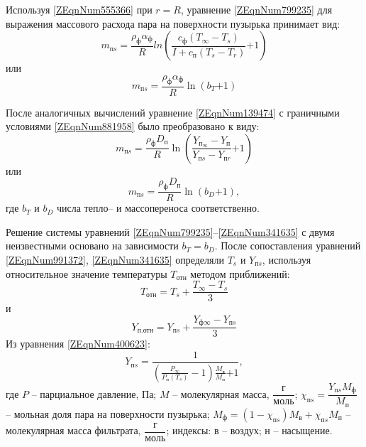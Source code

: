 Используя \eqref{ZEqnNum555366} при $r{ =}R$, уравнение \eqref{ZEqnNum799235} для выражения массового расхода пара на поверхности пузырька принимает вид:
\begin{equation} \label{10)} 
m_{{ п}s}{ =}\frac{{\rho }_{{ ф}}{\alpha }_{{ ф}}}{R}{ ln}\left(\frac{c_{{ ф}}\left(T_{\infty }{ -}T_{{ s}}\right)}{I{ +}c_{{ п}}\left(T_{{ s}}{ -}T_r\right)}{ +1}\right) 
\end{equation} 
или
\begin{equation} \label{ZEqnNum991372} 
m_{{ п}s}{ =}\frac{{\rho }_{{ ф}}{\alpha }_{{ ф}}}{R}{ \ln}\left(b_T{ +1}\right) 
\end{equation} 

После аналогичных вычислений уравнение \eqref{ZEqnNum139474} с граничными условиями \eqref{ZEqnNum881958} было преобразовано к виду:
\begin{equation} \label{12)} 
m_{{ п}s}{ =}\frac{{\rho }_{{ ф}}D_{{ п}}}{R}{ \ln}\left(\frac{Y_{{{ п}}_{\infty }}{ -}Y_{{ п}}}{Y_{{ п}s}{ -}Y_{{ п}r}}{ +1}\right) 
\end{equation} 
или
\begin{equation} \label{ZEqnNum341635} 
m_{{ п}s}{ =}\frac{{\rho }_{{ ф}}D_{{ п}}}{R}{ \ln}\left(b_D{ +1}\right),  
\end{equation} 
где $b_T$ и $b_D$ числа тепло-- и массопереноса соответственно.

Решение системы уравнений \eqref{ZEqnNum799235}--\eqref{ZEqnNum341635} с двумя неизвестными основано на зависимости $b_T{ =}b_D$. После сопоставления уравнений \eqref{ZEqnNum991372}, \eqref{ZEqnNum341635} определяли $T_s$ и $Y_{{ п}s}$, используя относительное значение температуры $T_{{ отн}}$ методом приближений:
\begin{equation} \label{14)} 
T_{{ отн}}{ =}T_s{ +}\frac{T_{\infty }{ -}T_s}{{ 3}} 
\end{equation} 
и
\begin{equation} \label{ZEqnNum400623} 
Y_{{ п.отн}}{ =}Y_{{ п}s}{ +}\frac{Y_{{ ф}\infty }{ -}Y_{{ п}s}}{{ 3}} 
\end{equation} 
Из уравнения \eqref{ZEqnNum400623}:
\begin{equation} \label{16)} 
Y_{{ п}s}{ =}\frac{{ 1}}{\left(\frac{P_{\infty }}{P_{{ н}}\left(T_s\right)}{ -}{ 1}\right)\frac{M_{{ в}}}{M_{{ п}}}{ +1}},  
\end{equation} 
где $P$ -- парциальное давление, Па; $M$ -- молекулярная масса, $\dfrac{г}{моль}$;  ${\chi }_{{ пs}}{ =}\dfrac{Y_{{ пs}}M_{{ ф}}}{M_{{ п}}}$ -- мольная доля пара на поверхности пузырька; $M_{{ ф}}{ =}\left({ 1-}{\chi }_{{ пs}}\right)M_{{ в}}{ +}{\chi }_{{ пs}}M_{{ п}}$ -- молекулярная масса фильтрата, $\dfrac{г}{моль}$; индексы: в -- воздух; н -- насыщение.

